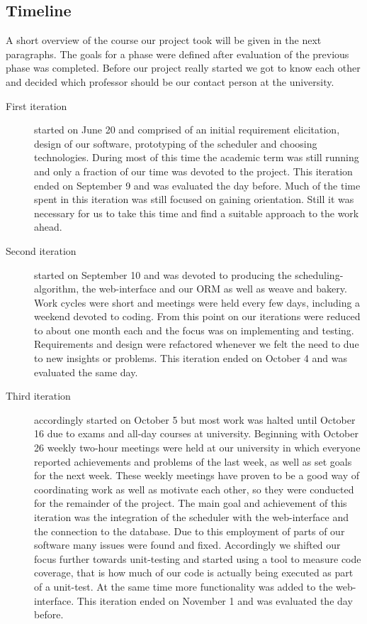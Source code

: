 \subsection{Timeline}
A short overview of the course our project took will be given in the next paragraphs. The goals for a phase were defined after evaluation of the previous phase was completed. Before our project really started we got to know each other and decided which professor should be our contact person at the university.

\begin{description}
\item[First iteration] started on June 20 and comprised of an initial requirement elicitation, design of our software, prototyping of the scheduler and choosing technologies. During most of this time the academic term was still running and only a fraction of our time was devoted to the project. This iteration ended on September 9 and was evaluated the day before. Much of the time spent in this iteration was still focused on gaining orientation. Still it was necessary for us to take this time and find a suitable approach to the work ahead.

\item[Second iteration] started on September 10 and was devoted to producing the scheduling-algorithm, the web-interface and our ORM as well as weave and bakery. Work cycles were short and meetings were held every few days, including a weekend  devoted to coding. From this point on our iterations were reduced to about one month each and the focus was on implementing and testing. Requirements and design were refactored whenever we felt the need to due to new insights or problems. This iteration ended on October 4 and was evaluated the same day.

\item[Third iteration] accordingly started on October 5 but most work was halted until October 16 due to exams and all-day courses at university. Beginning with October 26 weekly two-hour meetings were held at our university in which everyone reported achievements and problems of the last week, as well as set goals for the next week. These weekly meetings have proven to be a good way of coordinating work as well as motivate each other, so they were conducted for the remainder of the project. The main goal and achievement of this iteration was the integration of the scheduler with the web-interface and the connection to the database. Due to this employment of parts of our software many issues were found and fixed. Accordingly we shifted our focus further towards unit-testing and started using a tool to measure code coverage, that is how much of our code is actually being executed  as part of a unit-test. At the same time more  functionality was added to the web-interface. This iteration ended on November 1 and was evaluated the day before.


\end{description}
